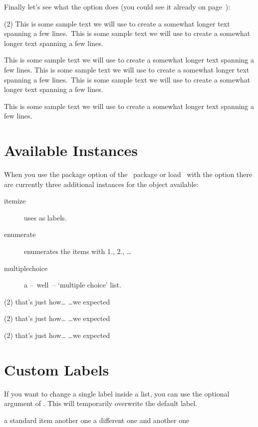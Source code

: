 \documentclass[load-preamble+]{cnltx-doc}
\newcommand*\sample{This is some sample text we will use to create a somewhat
  longer text spanning a few lines.}
\newcommand*\Sample{\sample\ \sample\par\sample}
\begin{document}
Finally let's see what the  option does (you could see it
already on page~\pageref{debug}):
\begin{example}
  \begin{tasks}(2)
    \task \Sample
    \task \Sample
  \end{tasks}
\end{example}

\section{Available Instances}\label{sec:tasks:instances}
When you use the package option  of the \Tasks\ package or load
\ExSheets\ with the  option there are currently three
additional instances for the  object available:
\begin{description}
  \item[itemize] uses  as labels.
  \item[enumerate] enumerates the items with 1., 2., \ldots
  \item[multiplechoice] a --~well~-- `multiple choice' list.
\end{description}
\begin{example}
  \begin{tasks}[style=itemize](2)
    \task that's just how\ldots
    \task \ldots we expected
  \end{tasks}
  \begin{tasks}[style=enumerate](2)
    \task that's just how\ldots
    \task \ldots we expected
  \end{tasks}
  \begin{tasks}[style=multiplechoice](2)
    \task that's just how\ldots
    \task \ldots we expected
  \end{tasks}
\end{example}

\section{Custom Labels}
If you want to change a single label inside a list, you can use the optional
argument of . This will temporarily overwrite the default label.
\begin{example}
  \begin{tasks}[style=itemize]
    \task a standard item
    \task another one
    \task[+] a different one
    \task and another one
  \end{tasks}
\end{example}
\end{document}
